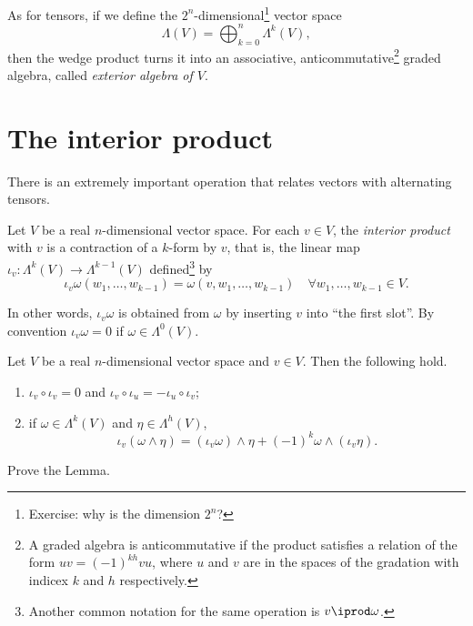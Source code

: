 \begin{remark}
	As for tensors, if we define the $2^n$-dimensional\footnote{Exercise: why is the dimension $2^n$?} vector space
	\begin{equation}
		\Lambda(V) = \bigoplus_{k=0}^n \Lambda^k(V),
	\end{equation}
	then the wedge product turns it into an associative, anticommutative\footnote{A graded algebra is anticommutative if the product satisfies a relation of the form $uv = {(-1)}^{kh}vu$, where $u$ and $v$ are in the spaces of the gradation with indicex $k$ and $h$ respectively.} graded algebra, called \emph{exterior algebra of $V$}.
\end{remark}

\section{The interior product}

There is an extremely important operation that relates vectors with alternating tensors.

\begin{definition}
	Let $V$ be a real $n$-dimensional vector space.
	For each $v\in V$, the \emph{interior product} with $v$ is a contraction of a $k$-form by $v$, that is, the linear map $\iota_v:\Lambda^{k}(V)\to \Lambda^{k-1}(V)$ defined\footnote{Another common notation for the same operation is $v \iprod \omega$.} by
	\begin{equation}
		\iota_v\omega(w_1,\ldots,w_{k-1}) = \omega(v,w_1,\ldots,w_{k-1})
		\quad \forall w_1,\ldots,w_{k-1} \in V.
	\end{equation}
\end{definition}

In other words, $\iota_v\omega$ is obtained from $\omega$ by inserting $v$ into ``the first slot''.
By convention $\iota_v\omega = 0$ if $\omega\in\Lambda^0(V)$.

\begin{lemma}\label{lemma:intprod}
	Let $V$ be a real $n$-dimensional vector space and $v\in V$.
	Then the following hold.
	\begin{enumerate}
		\item $\iota_v\circ \iota_v = 0$ and $\iota_v\circ\iota_u = -\iota_u\circ\iota_v$;
		\item if $\omega\in\Lambda^k(V)$ and $\eta\in\Lambda^h(V)$,
		      \begin{equation}
			      \iota_v(\omega\wedge\eta) = (\iota_v\omega)\wedge\eta + {(-1)}^k\omega\wedge(\iota_v\eta).
		      \end{equation}
	\end{enumerate}
\end{lemma}
\begin{exercise}
	Prove the Lemma.
\end{exercise}

